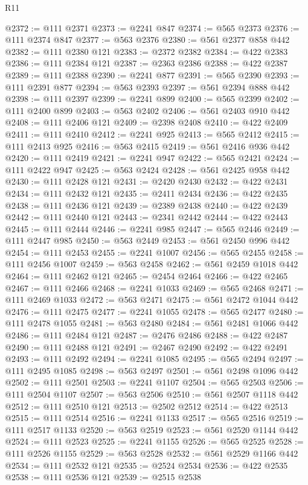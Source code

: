 \begin{lexlean}{R11}
\begin{coremodule}
@2372 := @111 @2371
@2373 := @2241 @847
@2374 := @565 @2373
@2376 := @111 @2374 @847
@2377 := @563 @2376
@2380 := @561 @2377 @858 @442
@2382 := @111 @2380 @121
@2383 := @2372 @2382
@2384 := @422 @2383
@2386 := @111 @2384 @121
@2387 := @2363 @2386
@2388 := @422 @2387
@2389 := @111 @2388
@2390 := @2241 @877
@2391 := @565 @2390
@2393 := @111 @2391 @877
@2394 := @563 @2393
@2397 := @561 @2394 @888 @442
@2398 := @111 @2397
@2399 := @2241 @899
@2400 := @565 @2399
@2402 := @111 @2400 @899
@2403 := @563 @2402
@2406 := @561 @2403 @910 @442
@2408 := @111 @2406 @121
@2409 := @2398 @2408
@2410 := @422 @2409
@2411 := @111 @2410
@2412 := @2241 @925
@2413 := @565 @2412
@2415 := @111 @2413 @925
@2416 := @563 @2415
@2419 := @561 @2416 @936 @442
@2420 := @111 @2419
@2421 := @2241 @947
@2422 := @565 @2421
@2424 := @111 @2422 @947
@2425 := @563 @2424
@2428 := @561 @2425 @958 @442
@2430 := @111 @2428 @121
@2431 := @2420 @2430
@2432 := @422 @2431
@2434 := @111 @2432 @121
@2435 := @2411 @2434
@2436 := @422 @2435
@2438 := @111 @2436 @121
@2439 := @2389 @2438
@2440 := @422 @2439
@2442 := @111 @2440 @121
@2443 := @2341 @2442
@2444 := @422 @2443
@2445 := @111 @2444
@2446 := @2241 @985
@2447 := @565 @2446
@2449 := @111 @2447 @985
@2450 := @563 @2449
@2453 := @561 @2450 @996 @442
@2454 := @111 @2453
@2455 := @2241 @1007
@2456 := @565 @2455
@2458 := @111 @2456 @1007
@2459 := @563 @2458
@2462 := @561 @2459 @1018 @442
@2464 := @111 @2462 @121
@2465 := @2454 @2464
@2466 := @422 @2465
@2467 := @111 @2466
@2468 := @2241 @1033
@2469 := @565 @2468
@2471 := @111 @2469 @1033
@2472 := @563 @2471
@2475 := @561 @2472 @1044 @442
@2476 := @111 @2475
@2477 := @2241 @1055
@2478 := @565 @2477
@2480 := @111 @2478 @1055
@2481 := @563 @2480
@2484 := @561 @2481 @1066 @442
@2486 := @111 @2484 @121
@2487 := @2476 @2486
@2488 := @422 @2487
@2490 := @111 @2488 @121
@2491 := @2467 @2490
@2492 := @422 @2491
@2493 := @111 @2492
@2494 := @2241 @1085
@2495 := @565 @2494
@2497 := @111 @2495 @1085
@2498 := @563 @2497
@2501 := @561 @2498 @1096 @442
@2502 := @111 @2501
@2503 := @2241 @1107
@2504 := @565 @2503
@2506 := @111 @2504 @1107
@2507 := @563 @2506
@2510 := @561 @2507 @1118 @442
@2512 := @111 @2510 @121
@2513 := @2502 @2512
@2514 := @422 @2513
@2515 := @111 @2514
@2516 := @2241 @1133
@2517 := @565 @2516
@2519 := @111 @2517 @1133
@2520 := @563 @2519
@2523 := @561 @2520 @1144 @442
@2524 := @111 @2523
@2525 := @2241 @1155
@2526 := @565 @2525
@2528 := @111 @2526 @1155
@2529 := @563 @2528
@2532 := @561 @2529 @1166 @442
@2534 := @111 @2532 @121
@2535 := @2524 @2534
@2536 := @422 @2535
@2538 := @111 @2536 @121
@2539 := @2515 @2538

\end{coremodule}
\end{lexlean}
